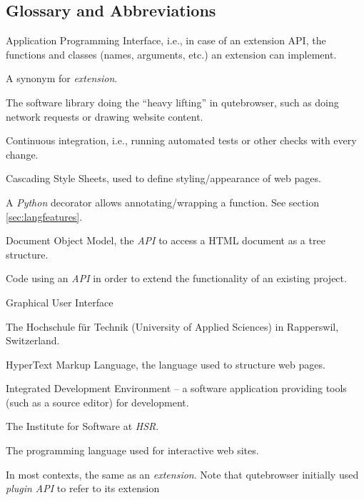 
\begin{appendices}
\chapter{Glossary and Abbreviations}
\begin{multicols}{2}
\label{ch:glossary}
\begin{description}[leftmargin=0pt]
  \item[API]{Application Programming Interface, i.e., in
      case of an extension API, the functions and classes (names, arguments,
      etc.) an extension can implement.}
  \item[add-on]{A synonym for \emph{extension}.}
  \item[backend]{The software library doing the ``heavy lifting'' in
      qutebrowser, such as doing network requests or drawing website content.}
  \item[CI]{Continuous integration, i.e., running automated tests or other
      checks with every change.}
  \item[CSS]{Cascading Style Sheets, used to define styling/appearance of web pages.}
  \item[decorator] A \emph{Python} decorator allows annotating/wrapping a
    function. See section \ref{sec:langfeatures}.
  \item[DOM]{Document Object Model, the \emph{API} to access a HTML document as
      a tree structure.}
  \item[extension]{Code using an \emph{API} in order to extend the functionality
      of an existing project.}
  \item[GUI]{Graphical User Interface}
  \item[HSR]{The Hochschule für Technik (University of Applied Sciences) in
      Rapperswil, Switzerland.}
  \item[HTML]{HyperText Markup Language, the language used to structure web
      pages.}
  \item[IDE]{Integrated Development Environment -- a software application
      providing tools (such as a source editor) for development.}
  \item[IFS]{The Institute for Software at \emph{HSR}.}
  \item[JavaScript]{The programming language used for interactive web sites.}
  \item[plugin]{In most contexts, the same as an \emph{extension}. Note that
      qutebrowser initially used \emph{plugin API} to refer to its extension
}
\end{description}
\end{multicols}
\end{appendices}
